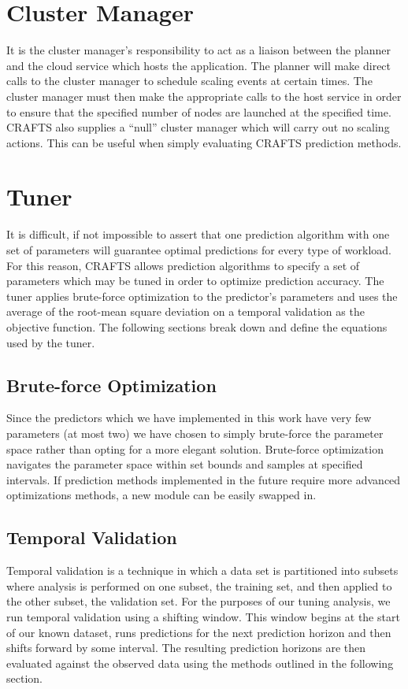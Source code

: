\section{Cluster Manager}
\label{sec:clustermanager}
It is the \textsf{cluster manager}'s responsibility to act as a liaison between the \textsf{planner} and the cloud service which hosts the application. The \textsf{planner} will make direct calls to the \textsf{cluster manager} to schedule scaling events at certain times. The \textsf{cluster manager} must then make the appropriate calls to the host service in order to ensure that the specified number of nodes are launched at the specified time. CRAFTS also supplies a ``null'' cluster manager which will carry out no scaling actions. This can be useful when simply evaluating CRAFTS prediction methods.

\section{Tuner}
\label{sec:tuner}
It is difficult, if not impossible to assert that one prediction algorithm with one set of parameters will guarantee optimal predictions for every type of workload. For this reason, CRAFTS allows prediction algorithms to specify a set of parameters which may be tuned in order to optimize prediction accuracy. The tuner applies brute-force optimization to the \textsf{predictor}'s parameters and uses the average of the root-mean square deviation on a temporal validation as the objective function. The following sections break down and define the equations used by the tuner.

\subsection{Brute-force Optimization}
Since the predictors which we have implemented in this work have very few parameters (at most two) we have chosen to simply brute-force the parameter space rather than opting for a more elegant solution. Brute-force optimization navigates the parameter space within set bounds and samples at specified intervals. If prediction methods implemented in the future require more advanced optimizations methods, a new module can be easily swapped in.

\subsection{Temporal Validation}
Temporal validation is a technique in which a data set is partitioned into subsets where analysis is performed on one subset, the training set, and then applied to the other subset, the validation set. For the purposes of our tuning analysis, we run temporal validation using a shifting window. This window begins at the start of our known dataset, runs predictions for the next prediction horizon and then shifts forward by some interval. The resulting prediction horizons are then evaluated against the observed data using the methods outlined in the following section.

